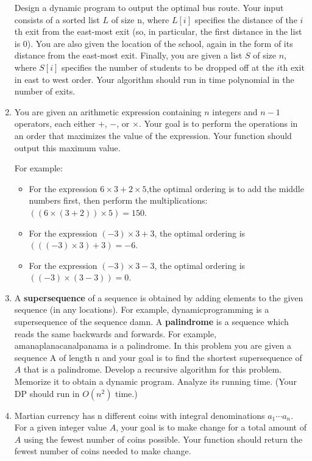 \documentclass{article}
\begin{document}
\begin{enumerate}
Design a dynamic program to output the optimal bus route. Your input consists of a sorted list $L$ of size n, where $L[i]$ specifies the distance of the $i$th exit from the east-most exit (so, in particular, the first distance in the list is 0). You are also given the location of the school, again in the form of its distance from the east-most exit.
Finally, you are given a list $S$ of size $n$, where $S[i]$ specifies the number of students to be dropped off at the $i$th exit in east to west order. Your algorithm should run in time polynomial in the number of exits.

\item You are given an arithmetic expression containing $n$ integers and $n - 1$ operators, each either $+$, $-$, or $\times$. Your goal is to perform the operations in an order that maximizes the value of the expression. Your function should output this maximum value.

For example:
\begin{itemize}
\item For the expression $6\times 3 + 2 \times 5$,the optimal ordering is to add the middle numbers first, then perform the multiplications: $((6 \times (3 + 2)) \times 5) = 150$.
\item For the expression $(-3) \times 3 + 3$, the optimal ordering is $(((-3) \times 3) + 3) = -6$. 
\item For the expression $(-3) \times 3 - 3$, the optimal ordering is $((-3) \times (3 - 3)) = 0$.
\end{itemize}


\item
A \textbf{supersequence} of a sequence is obtained by adding elements to the given sequence (in any locations). For example, dynamicprogramming is a supersequence of the sequence damn. A \textbf{palindrome} is a sequence which reads the same backwards and forwards. For example, amanaplanacanalpanama is a palindrome.
In this problem you are given a sequence A of length n and your goal is to ﬁnd the shortest supersequence of $A$ that is a palindrome. Develop a recursive algorithm for this problem. Memorize it to obtain a dynamic program. Analyze its running time. (Your DP should run in $O(n^2)$ time.)

\item Martian currency has n different coins with integral denominations $a_1 \cdots a_n$. For a given integer value $A$, your goal is to make change for a total amount of $A$ using the fewest number of coins possible. Your function should return the fewest number of coins needed to make change.



\end{enumerate}
\end{document}
